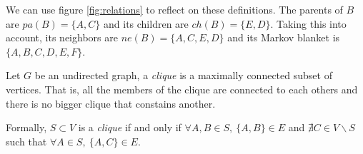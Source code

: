 We can use figure \ref{fig:relations} to reflect on these definitions. The parents
of \(B\) are \(pa(B) = \{A,C\}\) and its children are \(ch(B) = \{E,D\}\). Taking this into account, its neighbors
are \(ne(B) = \{A,C,E,D\}\) and its Markov blanket is \(\{A,B,C,D,E,F\}\).

\begin{definition}
Let \(G\) be an undirected graph, a \emph{clique} is a maximally connected
subset of vertices. That is, all the members of the clique are connected to each
others and there is no bigger clique that constains another.

Formally, \(S \subset V\) is a \emph{clique} if and only if \(\forall A,B \in S,
\ \{A,B\} \in E\) and \(\nexists C \in V\backslash S\) such that \(\forall A \in
S, \ \{A, C\} \in E \).
\end{definition}
